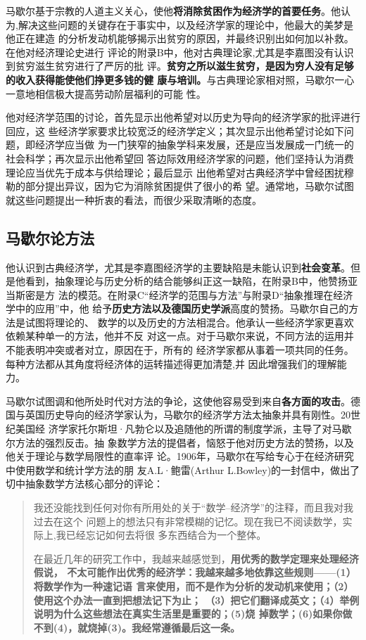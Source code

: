 马歇尔基于宗教的人道主义关心，使他\textbf{将消除贫困作为经济学的首要任务}。他认
为,解决这些问题的关键存在于事实中，以及经济学家的理论中，他最大的美梦是他正在建造
的分析发动机能够揭示出贫穷的原因，并最终识别出如何加以补救。在他对经济理论史进行
评论的附录B中，他对古典理论家,尤其是李嘉图没有认识到贫穷滋生贫穷进行了严厉的批
评。\textbf{贫穷之所以滋生贫穷，是因为穷人没有足够的收入获得能使他们挣更多钱的健
  康与培训。}与古典理论家相对照，马歇尔一心一意地相信极大提高劳动阶层福利的可能
性。

他对经济学范围的讨论，首先显示出他希望对以历史为导向的经济学家的批评进行回应，这
些经济学家要求比较宽泛的经济学定义；其次显示出他希望讨论如下问题，即经济学应当做
为一门狭窄的抽象学科来发展，还是应当发展成一门统一的社会科学；再次显示出他希望回
答边际效用经济学家的问题，他们坚持认为消费理论应当优先于成本与供给理论；最后显示
出他希望对古典经济学中曾经困扰穆勒的部分提出异议，因为它为消除贫困提供了很小的希
望。通常地，马歇尔试图就这些问题提出一种折衷的看法，而很少采取清晰的态度。

\subsection{马歇尔论方法}

他认识到古典经济学，尤其是李嘉图经济学的主要缺陷是未能认识到\textbf{社会变革}。但
是他看到，抽象理论与历史分析的结合能够纠正这一缺陷，在附录B中，他赞扬亚当斯密是方
法的模范。在附录C“经济学的范围与方法”与附录D“抽象推理在经济学中的应用”中，他
给予\textbf{历史方法以及德国历史学派}高度的赞扬。马歇尔自己的方法是试图将理论的、
数学的以及历史的方法相混合。他承认一些经济学家更喜欢依赖某种单一的方法，他并不反
对这一点。对于马歇尔来说，不同方法的运用并不能表明冲突或者对立，原因在于，所有的
经济学家都从事着一项共同的任务。每种方法都从其角度将经济体的运转描述得更加清楚,并
因此增强我们的理解能力。

马歇尔试图调和他所处时代对方法的争论，这使他容易受到来自\textbf{各方面的攻击}。德
国与英国历史导向的经济学家认为，马歇尔的经济学方法太抽象并具有刚性。20世纪美国经
济学家托尔斯坦·凡勃仑以及追随他的所谓的制度学派，主导了对马歇尔方法的强烈反击。抽
象数学方法的提倡者，恼怒于他对历史方法的赞扬，以及他关于理论与数学局限性的直率评
论。1906年，马歇尔在写给专心于在经济研究中使用数学和统计学方法的朋
友A.L·鲍雷(Arthur L.Bowley)的一封信中，做出了切中抽象数学方法核心部分的评论：
\begin{quotation}
  我还没能找到任何对你有所用处的关于“数学--经济学”的注释，而且我对我过去在这个
  问题上的想法只有非常模糊的记忆。现在我已不阅读数学，实际上,我已经忘记如何去将很
  多东西结合为一个整体。

  在最近几年的研究工作中，我越来越感觉到，\textbf{用优秀的数学定理来处理经济假说，
    不太可能作出优秀的经济学：我越来越多地依靠这些规则——(1）将数学作为一种速记语
    言来使用，而不是作为分析的发动机来使用；（2）使用这个办法一直到把想法记下为止；
    （3）把它们翻译成英文；（4）举例说明为什么这些想法在真实生活里是重要的；(5)烧
    掉数学；(6)如果你做不到(4)，就烧掉(3)。我经常遵循最后这一条。}
\end{quotation}

